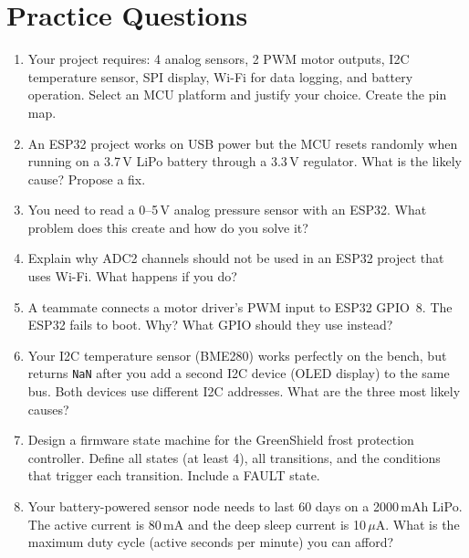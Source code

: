 \section{Practice Questions}
\begin{enumerate}[leftmargin=1.5em]
\item Your project requires: 4 analog sensors, 2 PWM motor outputs, I2C temperature sensor, SPI display, Wi-Fi for data logging, and battery operation. Select an MCU platform and justify your choice. Create the pin map.
\item An ESP32 project works on USB power but the MCU resets randomly when running on a 3.7\,V LiPo battery through a 3.3\,V regulator. What is the likely cause? Propose a fix.
\item You need to read a 0--5\,V analog pressure sensor with an ESP32. What problem does this create and how do you solve it?
\item Explain why ADC2 channels should not be used in an ESP32 project that uses Wi-Fi. What happens if you do?
\item A teammate connects a motor driver's PWM input to ESP32 GPIO~8. The ESP32 fails to boot. Why? What GPIO should they use instead?
\item Your I2C temperature sensor (BME280) works perfectly on the bench, but returns \texttt{NaN} after you add a second I2C device (OLED display) to the same bus. Both devices use different I2C addresses. What are the three most likely causes?
\item Design a firmware state machine for the GreenShield frost protection controller. Define all states (at least 4), all transitions, and the conditions that trigger each transition. Include a FAULT state.
\item Your battery-powered sensor node needs to last 60 days on a 2000\,mAh LiPo. The active current is 80\,mA and the deep sleep current is 10\,$\mu$A. What is the maximum duty cycle (active seconds per minute) you can afford?
\end{enumerate}

